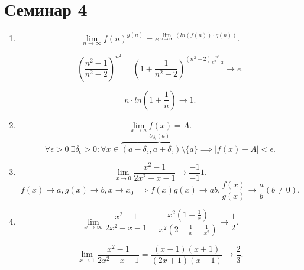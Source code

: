 \section{Семинар 4}

\begin{enumerate}
\item 
    \begin{equation*}
        \lim_{n \to \infty} f(n)^{g(n)} = e^{\lim_{n \to \infty}(ln(f(n)) \cdot g(n))}
    .\end{equation*}

    \begin{equation*}
        \left(\frac{n^2 - 1}{n^2 - 2}\right)^{n^2} = \left(1 + \frac{1}{n^2 - 2}\right)^{(n^2 - 2)\frac{n^2}{n^2 - 2}}
        \xrightarrow[]{} e
    .\end{equation*}

    \begin{equation*}
        n \cdot ln\left(1 + \frac{1}{n}\right) 
        \xrightarrow[]{} 1
    .\end{equation*}

\item
    \begin{equation*}
        \lim_{x \to a} f(x) = A
    .\end{equation*}
    \begin{equation*}
        \forall \epsilon > 0 \ \exists \delta_\epsilon > 0 : \forall x \in \overbrace{(a - \delta_\epsilon, a + \delta_\epsilon) \setminus \{a\}}^{U_{\delta_\epsilon} (a) } \implies |f(x) - A| < \epsilon
    .\end{equation*}

\item
    \begin{equation*}
        \lim_{x \to 0} \frac{x^2 - 1}{2x^2 - x - 1} \to \frac{-1}{-1} 1
    .\end{equation*}
    \begin{equation*}
        f(x) \to a, g(x) \to b, x \to x_0 \implies f(x)g(x) \to ab, \frac{f(x)}{g(x)} \to \frac{a}{b} (b \neq 0)
    .\end{equation*}

\item
    \begin{equation*}
        \lim_{x \to \infty} \frac{x^2 - 1}{2x^2 - x - 1} = \frac{x^2(1 - \frac{1}{x})}{x^2(2 - \frac{1}{x} - \frac{1}{x^2})} \to \frac{1}{2}
    .\end{equation*}

    \begin{equation*}
        \lim_{x \to 1} \frac{x^2 - 1}{2x^2 - x - 1} = \frac{(x - 1)(x + 1)}{(2x + 1)(x - 1)} \to \frac{2}{3}
    .\end{equation*}


\end{enumerate}
